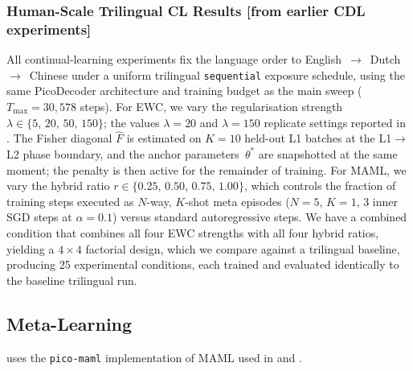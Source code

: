 \subsubsection{Human-Scale Trilingual CL Results [from earlier CDL experiments]}

All continual-learning experiments fix the language order to English~$\to$~Dutch~$\to$~Chinese under a uniform trilingual \texttt{sequential} exposure schedule, using the same PicoDecoder architecture and training budget as the main sweep ($T_{\max}\!=\!30{,}578$ steps). For EWC, we vary the regularisation strength $\lambda\!\in\!\{5,\,20,\,50,\,150\}$; the values $\lambda\!=\!20$ and $\lambda\!=\!150$ replicate settings reported in \citep{constantinescu2025investigating}.  The Fisher diagonal $\hat{F}$ is estimated on $K\!=\!10$ held-out L1 batches at the L1$\to$L2 phase boundary, and the anchor parameters~$\theta^*$ are snapshotted at the same moment; the penalty is then active for the remainder of training. For MAML, we vary the hybrid ratio $r\!\in\!\{0.25,\,0.50,\,0.75,\,1.00\}$, which controls the fraction of training steps executed as $N$-way, $K$-shot meta episodes ($N\!=\!5$, $K\!=\!1$, 3 inner SGD steps at $\alpha\!=\!0.1$) versus standard autoregressive steps. We have a combined condition that combines all four EWC strengths with all four hybrid ratios, yielding a $4\!\times\!4$ factorial design, which we compare against a trilingual baseline, producing 25 experimental conditions, each trained and evaluated identically to the baseline trilingual run.




\subsection{Meta-Learning}

\beetle{}  uses the \texttt{pico-maml} implementation of MAML used in \citet{africa-etal-2025-learning} and \citet{africa-etal-2025-meta}. 


